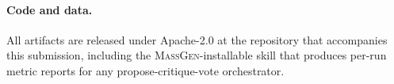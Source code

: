 \documentclass[10pt,a4paper]{article}
\begin{document}
\paragraph{Code and data.} All artifacts are released under Apache-2.0 at the
repository that accompanies this submission, including the
\textsc{MassGen}-installable skill that produces per-run metric reports for
any propose-critique-vote orchestrator.

\small


\end{document}
